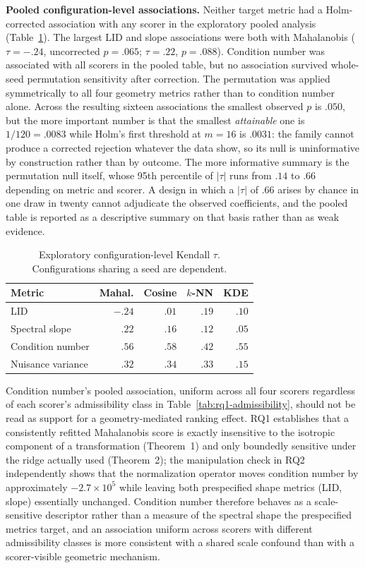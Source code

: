 \documentclass[11pt,a4paper]{article}
\begin{document}
\textbf{Pooled configuration-level associations.} Neither target metric had a Holm-corrected association with any scorer in the exploratory pooled analysis (Table~\ref{tab:rq2}). The largest LID and slope associations were both with Mahalanobis ($\tau=-.24$, uncorrected $p=.065$; $\tau=.22$, $p=.088$). Condition number was associated with all scorers in the pooled table, but no association survived whole-seed permutation sensitivity after correction. The permutation was applied symmetrically to all four geometry metrics rather than to condition number alone. Across the resulting sixteen associations the smallest observed $p$ is $.050$, but the more important number is that the smallest \emph{attainable} one is $1/120=.0083$ while Holm's first threshold at $m=16$ is $.0031$: the family cannot produce a corrected rejection whatever the data show, so its null is uninformative by construction rather than by outcome. The more informative summary is the permutation null itself, whose 95th percentile of $|\tau|$ runs from $.14$ to $.66$ depending on metric and scorer. A design in which a $|\tau|$ of $.66$ arises by chance in one draw in twenty cannot adjudicate the observed coefficients, and the pooled table is reported as a descriptive summary on that basis rather than as weak evidence.

\begin{table}[t]
\centering
\caption{Exploratory configuration-level Kendall $\tau$. Configurations sharing a seed are dependent.}
\label{tab:rq2}
\small
\begin{tabular}{lrrrr}
\toprule
Metric & Mahal. & Cosine & $k$-NN & KDE\\
\midrule
LID & $-.24$ & $.01$ & $.19$ & $.10$\\
Spectral slope & $.22$ & $.16$ & $.12$ & $.05$\\
Condition number & $.56$ & $.58$ & $.42$ & $.55$\\
Nuisance variance & $.32$ & $.34$ & $.33$ & $.15$\\
\bottomrule
\end{tabular}
\end{table}

Condition number's pooled association, uniform across all four scorers regardless of each scorer's admissibility class in Table~\ref{tab:rq1-admissibility}, should not be read as support for a geometry-mediated ranking effect. RQ1 establishes that a consistently refitted Mahalanobis score is exactly insensitive to the isotropic component of a transformation (Theorem~1) and only boundedly sensitive under the ridge actually used (Theorem~2); the manipulation check in RQ2 independently shows that the normalization operator moves condition number by approximately $-2.7\times10^{5}$ while leaving both prespecified shape metrics (LID, slope) essentially unchanged. Condition number therefore behaves as a scale-sensitive descriptor rather than a measure of the spectral shape the prespecified metrics target, and an association uniform across scorers with different admissibility classes is more consistent with a shared scale confound than with a scorer-visible geometric mechanism.
\end{document}
